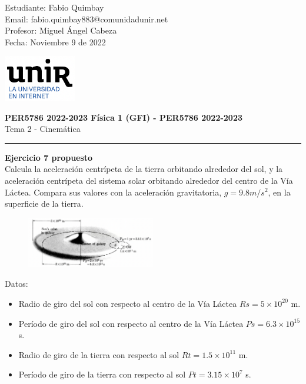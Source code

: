 \documentclass[11pt,letterpaper]{article}
\begin{document}
\pagestyle{plain}

\begin{flushleft}
Estudiante: Fabio Quimbay\\
Email: fabio.quimbay883@comunidadunir.net\\
Profesor: Miguel Ángel Cabeza\\
Fecha: Noviembre 9 de 2022\\
\end{flushleft}

\begin{flushright}\vspace{-20mm}
\includegraphics[height=2cm]{logo.png}
\end{flushright}
 
\begin{center}\vspace{0cm}
\textbf{\large PER5786 2022-2023  Física 1 (GFI) - PER5786 2022-2023}\\
 Tema 2 - Cinemática
\end{center}

 
\rule{\linewidth}{0.1mm}

\bigskip
\bigskip

\textbf{Ejercicio 7 propuesto}\\

Calcula la aceleración centrípeta de la tierra orbitando alrededor del sol, y la aceleración centrípeta del sistema solar orbitando alrededor del centro de la Vía Láctea. Compara sus valores con la aceleración gravitatoria, $g=9.8 m/s^2$, en la superficie de la tierra.\\

\begin{figure}[h]
\centering
\includegraphics[width=0.5\textwidth]{ejemplo_7.png}
\end{figure}

Datos: 
\begin{itemize}
  \item Radio de giro del sol con respecto al centro de la Vía Láctea $Rs=5 \times 10^{20}$ m.
  \item Período de giro del sol con respecto al centro de la Vía Láctea $Ps=6.3 \times 10^{15}$ s.
  \item Radio de giro de la tierra con respecto al sol $Rt=1.5 \times 10^{11}$ m.
  \item Período de giro de la tierra con respecto al sol $Pt=3.15 \times 10^{7}$ s.
\end{itemize}
\end{document}
